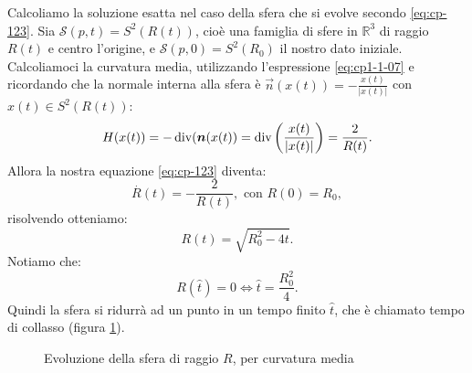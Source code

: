 \begin{esempio}
Calcoliamo la soluzione esatta nel caso della sfera che si evolve secondo  \eqref{eq:cp-123}. Sia $\mathcal{S}(p,t) = S^2(R(t))$, cioè una famiglia di sfere in $\mathbb{R}^3$ di raggio $R(t)$ e centro l'origine, e $\mathcal{S}(p,0) = S^2(R_0)$ il nostro dato iniziale. Calcoliamoci la curvatura media, utilizzando l'espressione \eqref{eq:cp1-1-07} e ricordando che la normale interna alla sfera è $\vec{n}(x(t))=-\frac{x(t)}{|x(t)|}$ con $x(t)\in S^2(R(t))$:
\[
H(x(t)) =-\operatorname{div}(\bm{n}(x(t))=\operatorname{div}\left(\frac{x(t)}{|x(t)|}\right)=\frac{2}{R(t)}.   
\]
Allora la nostra equazione \eqref{eq:cp-123} diventa:
\[
\overset{\displaystyle.}{R}(t)=-\frac{2}{R(t)}, \text{ con } R(0) = R_0,
\]
risolvendo otteniamo:
\[
R(t)=\sqrt{R_0^2-4t}.
\]
Notiamo che:
\[
R(\hat{t})=0 \Longleftrightarrow \hat{t}=\frac{R_0^2}{4}.
\]
Quindi la sfera si ridurrà ad un punto in un tempo finito $\hat{t}$, che è chiamato tempo di collasso (figura \ref{fig:cp-121}).

\begin{figure}[!htbp]
  \begin{center}
  \end{center}
  \caption{Evoluzione della sfera di raggio $R$, per curvatura media}
  \label{fig:cp-121}
\end{figure}
\end{esempio}


